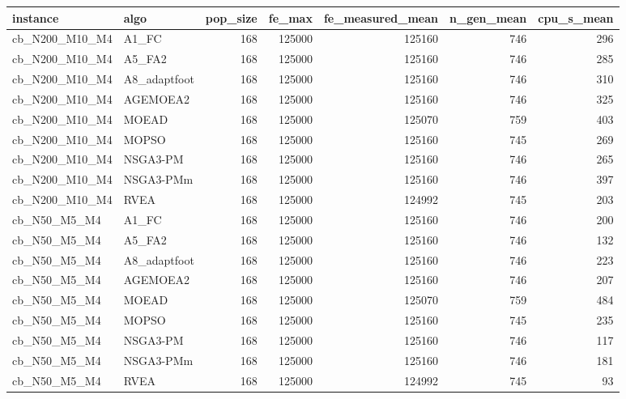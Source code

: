 \begin{tabular}{llrrrrr}
\toprule
instance & algo & pop_size & fe_max & fe_measured_mean & n_gen_mean & cpu_s_mean \\
\midrule
cb_N200_M10_M4 & A1_FC & 168 & 125000 & 125160 & 746 & 296 \\
cb_N200_M10_M4 & A5_FA2 & 168 & 125000 & 125160 & 746 & 285 \\
cb_N200_M10_M4 & A8_adaptfoot & 168 & 125000 & 125160 & 746 & 310 \\
cb_N200_M10_M4 & AGEMOEA2 & 168 & 125000 & 125160 & 746 & 325 \\
cb_N200_M10_M4 & MOEAD & 168 & 125000 & 125070 & 759 & 403 \\
cb_N200_M10_M4 & MOPSO & 168 & 125000 & 125160 & 745 & 269 \\
cb_N200_M10_M4 & NSGA3-PM & 168 & 125000 & 125160 & 746 & 265 \\
cb_N200_M10_M4 & NSGA3-PMm & 168 & 125000 & 125160 & 746 & 397 \\
cb_N200_M10_M4 & RVEA & 168 & 125000 & 124992 & 745 & 203 \\
cb_N50_M5_M4 & A1_FC & 168 & 125000 & 125160 & 746 & 200 \\
cb_N50_M5_M4 & A5_FA2 & 168 & 125000 & 125160 & 746 & 132 \\
cb_N50_M5_M4 & A8_adaptfoot & 168 & 125000 & 125160 & 746 & 223 \\
cb_N50_M5_M4 & AGEMOEA2 & 168 & 125000 & 125160 & 746 & 207 \\
cb_N50_M5_M4 & MOEAD & 168 & 125000 & 125070 & 759 & 484 \\
cb_N50_M5_M4 & MOPSO & 168 & 125000 & 125160 & 745 & 235 \\
cb_N50_M5_M4 & NSGA3-PM & 168 & 125000 & 125160 & 746 & 117 \\
cb_N50_M5_M4 & NSGA3-PMm & 168 & 125000 & 125160 & 746 & 181 \\
cb_N50_M5_M4 & RVEA & 168 & 125000 & 124992 & 745 & 93 \\
\bottomrule
\end{tabular}
